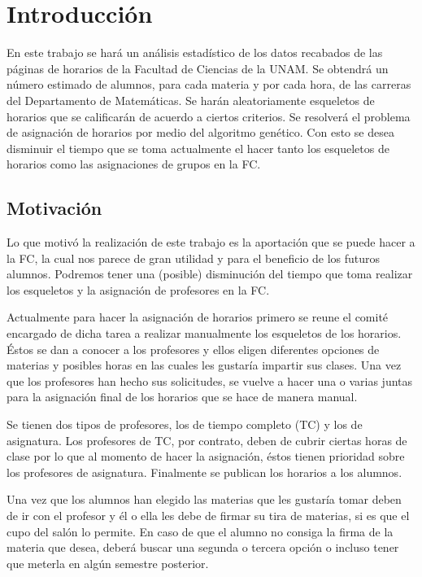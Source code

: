 \chapter{Introducción}

En este trabajo se hará un análisis estadístico de los datos recabados de las páginas de horarios de la Facultad de Ciencias de la UNAM. Se obtendrá un número estimado de alumnos, para cada materia y por cada hora, de las carreras del Departamento de Matemáticas. Se harán aleatoriamente esqueletos de horarios que se calificarán de acuerdo a ciertos criterios. Se resolverá el problema de asignación de horarios por medio del algoritmo genético. Con esto se desea disminuir el tiempo que se toma actualmente el hacer tanto los esqueletos de horarios como las asignaciones de grupos en la FC.

\section{Motivación}

Lo que motivó la realización de este trabajo es la aportación que se puede hacer a la FC, la cual nos parece de gran utilidad y para el beneficio de los futuros alumnos. Podremos tener una (posible) disminución del tiempo que toma realizar los esqueletos y la asignación de profesores en la FC.

Actualmente para hacer la asignación de horarios primero se reune el comité encargado de dicha tarea a realizar manualmente los esqueletos de los horarios. Éstos se dan a conocer a los profesores y ellos eligen diferentes opciones de materias y posibles horas en las cuales les gustaría impartir sus clases. Una vez que los profesores han hecho sus solicitudes, se vuelve a hacer una o varias juntas para la asignación final de los horarios que se hace de manera manual.

Se tienen dos tipos de profesores, los de tiempo completo (TC) y los de asignatura. Los profesores de TC, por contrato, deben de cubrir ciertas horas de clase por lo que al momento de hacer la asignación, éstos tienen prioridad sobre los profesores de asignatura. Finalmente se publican los horarios a los alumnos.

Una vez que los alumnos han elegido las materias que les gustaría tomar deben de ir con el profesor y él o ella les debe de firmar su tira de materias, si es que el cupo del salón lo permite. En caso de que el alumno no consiga la firma de la materia que desea, deberá buscar una segunda o tercera opción o incluso tener que meterla en algún semestre posterior.

